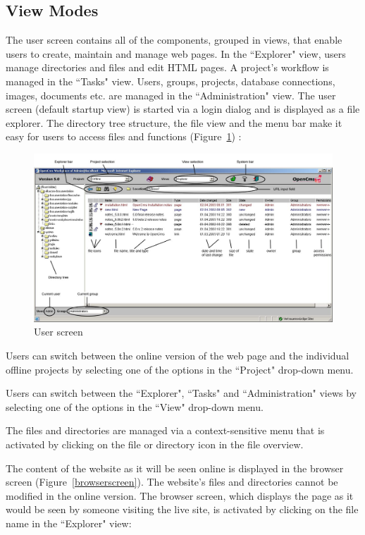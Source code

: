 \subsection{View Modes}

The user screen contains all of the components, grouped in views,
that enable users to create, maintain and manage web pages. In the
``Explorer" view, users manage directories and files and edit HTML
pages. A project's workflow is managed in the ``Tasks" view. Users,
groups, projects, database connections, images, documents etc. are
managed in the ``Administration" view. The user screen (default
startup view) is started via a login dialog and is displayed as a
file explorer. The directory tree structure, the file view and the
menu bar make it easy for users to access files and functions
(Figure~\ref{workplace}) :

\begin{figure}[!hbt]
\begin{center}
\includegraphics[width=\sgw]
                   {pics/usermanual/workplace}
\caption[User screen]
           {User screen}
\label{workplace}
\end{center}
\end{figure}

Users can switch between the online version of the web page and
the individual offline projects by selecting one of the options in the
``Project" drop-down menu.

Users can switch between the ``Explorer", ``Tasks" and
``Administration" views by selecting one of the options in the
``View" drop-down menu.

The files and directories are managed via a context-sensitive menu
that is activated by clicking on the file or directory icon in the
file overview.

The content of the website as it will be seen online is displayed
in the browser screen (Figure~\ref{browserscreen}). The website's
files and directories cannot be modified in the online version.
The browser screen, which displays the page as it would be seen by
someone visiting the live site, is activated by clicking on the
file name in the ``Explorer" view:

